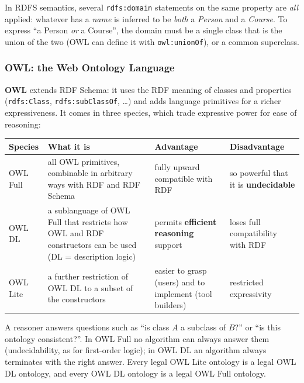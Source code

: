 \begin{nbwarning}
In RDFS semantics, several \texttt{rdfs:domain} statements on the same property are
\emph{all} applied: whatever has a \emph{name} is inferred to be \emph{both} a
\emph{Person} and a \emph{Course}. To express ``a Person \emph{or} a Course'', the
domain must be a single class that is the union of the two (OWL can define it with
\texttt{owl:unionOf}), or a common superclass.
\end{nbwarning}

\subsubsection{OWL: the Web Ontology Language}

\textbf{OWL} extends RDF Schema: it uses the RDF meaning of classes and properties
(\texttt{rdfs:Class}, \texttt{rdfs:subClassOf}, \ldots) and adds language primitives for
a richer expressiveness. It comes in three species, which trade expressive power for
ease of reasoning:

\begin{center}
\small
\begin{tabularx}{\linewidth}{@{}l >{\raggedright\arraybackslash}X >{\raggedright\arraybackslash}X >{\raggedright\arraybackslash}X@{}}
\toprule
\textbf{Species} & \textbf{What it is} & \textbf{Advantage} & \textbf{Disadvantage} \\
\midrule
OWL Full & all OWL primitives, combinable in arbitrary ways with RDF and RDF Schema &
  fully upward compatible with RDF & so powerful that it is \textbf{undecidable} \\
OWL DL & a sublanguage of OWL Full that restricts how OWL and RDF constructors can be
  used (DL = description logic) & permits \textbf{efficient reasoning} support & loses
  full compatibility with RDF \\
OWL Lite & a further restriction of OWL DL to a subset of the constructors & easier to
  grasp (users) and to implement (tool builders) & restricted expressivity \\
\bottomrule
\end{tabularx}
\end{center}

\begin{nbintuition}
A reasoner answers questions such as ``is class $A$ a subclass of $B$?'' or ``is this
ontology consistent?''. In OWL Full no algorithm can always answer them
(undecidability, as for first-order logic); in OWL DL an algorithm always terminates
with the right answer. Every legal OWL Lite ontology is a legal OWL DL ontology, and
every OWL DL ontology is a legal OWL Full ontology.
\end{nbintuition}

